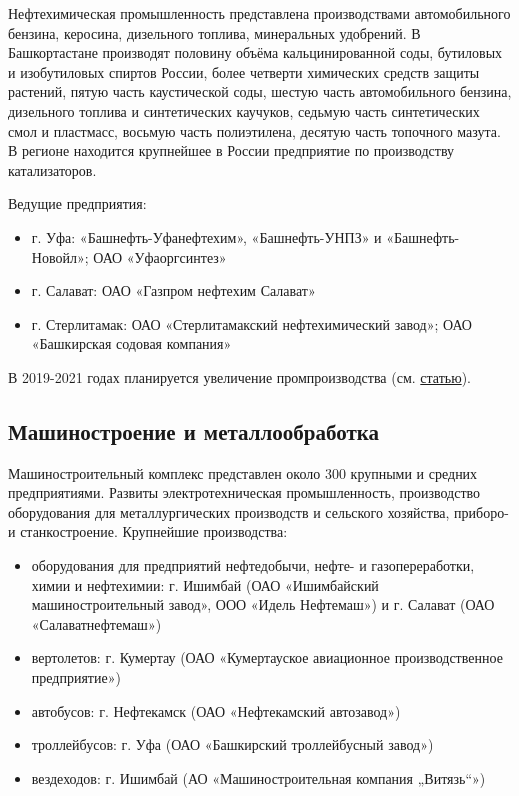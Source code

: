Нефтехимическая промышленность представлена производствами автомобильного бензина, керосина, дизельного топлива, минеральных удобрений. В Башкортастане производят половину объёма кальцинированной соды, бутиловых и изобутиловых спиртов России, более четверти химических средств защиты растений, пятую часть каустической соды, шестую часть автомобильного бензина, дизельного топлива и синтетических каучуков, седьмую часть синтетических смол и пластмасс, восьмую часть полиэтилена, десятую часть топочного мазута. В регионе находится крупнейшее в России предприятие по производству катализаторов. 

Ведущие предприятия:
\begin{itemize}
\item г. Уфа: «Башнефть-Уфанефтехим», «Башнефть-УНПЗ» и «Башнефть-Новойл»; ОАО «Уфаоргсинтез»
\item г. Салават: ОАО «Газпром нефтехим Салават»
\item г. Стерлитамак: ОАО «Стерлитамакский нефтехимический завод»; ОАО «Башкирская содовая компания»
\end{itemize}

В 2019-2021 годах планируется увеличение промпроизводства (см. \href{https://neftegaz.ru/news/finance/197497-rost-promproizvodstva-v-2019-2021-gg-v-respublike-bashkortostan-obespechat-neftekhimiya-i-aviaprom/}{статью}).

\subsection{Машиностроение и металлообработка}

Машиностроительный комплекс представлен около 300 крупными и средних предприятиями. Развиты электротехническая промышленность, производство оборудования для металлургических производств и сельского хозяйства, приборо- и станкостроение. Крупнейшие производства:
\begin{itemize}
\item оборудования для предприятий нефтедобычи, нефте- и газопереработки, химии и нефтехимии: г. Ишимбай (ОАО «Ишимбайский машиностроительный завод», ООО «Идель Нефтемаш») и г. Салават (ОАО «Салаватнефтемаш»)
\item вертолетов: г. Кумертау (ОАО «Кумертауское авиационное производственное предприятие»)
\item автобусов: г. Нефтекамск (ОАО «Нефтекамский автозавод»)
\item троллейбусов: г. Уфа (ОАО «Башкирский троллейбусный завод»)
\item вездеходов: г. Ишимбай (АО «Машиностроительная компания „Витязь“»)
\end{itemize}

